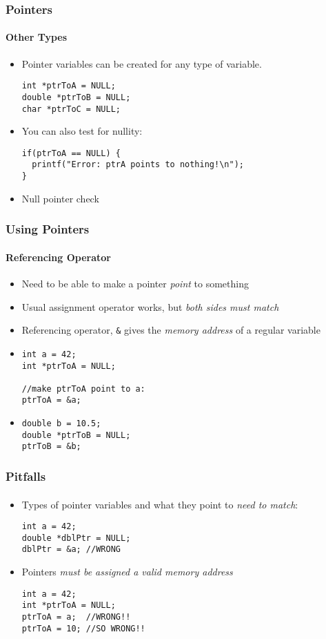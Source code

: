 \documentclass[]{beamer}
\begin{document}
\begin{frame}[fragile]
  \frametitle{Pointers}
  \framesubtitle{Other Types}

\begin{itemize}[<+->]
  \item Pointer variables can be created for any type of variable.
\begin{verbatim}
int *ptrToA = NULL;
double *ptrToB = NULL;
char *ptrToC = NULL;
\end{verbatim}

  \item You can also test for nullity:
\begin{verbatim}
if(ptrToA == NULL) {
  printf("Error: ptrA points to nothing!\n");
}
\end{verbatim}
  \item Null pointer check
\end{itemize}

\end{frame}


\begin{frame}[fragile]
  \frametitle{Using Pointers}
  \framesubtitle{Referencing Operator}

\begin{itemize}[<+->]
  \item Need to be able to make a pointer \emph{point} to something
  \item Usual assignment operator works, but \emph{both sides must match}
  \item Referencing operator, \texttt{&} gives the \emph{memory address} of a regular variable
  \item[~]
\begin{verbatim}
int a = 42;
int *ptrToA = NULL;

//make ptrToA point to a:
ptrToA = &a;
\end{verbatim}
  \item[~]
\begin{verbatim}
double b = 10.5;
double *ptrToB = NULL;
ptrToB = &b;
\end{verbatim}
\end{itemize}
    
\end{frame}

\begin{frame}[fragile]
  \frametitle{Pitfalls}
  \framesubtitle{}

\begin{itemize}[<+->]
  \item Types of pointer variables and what they point to \emph{need to match}:
\begin{verbatim}
int a = 42;
double *dblPtr = NULL;
dblPtr = &a; //WRONG
\end{verbatim}
  \item Pointers \emph{must be assigned a valid memory address}
\begin{verbatim}
int a = 42;
int *ptrToA = NULL;
ptrToA = a;  //WRONG!!
ptrToA = 10; //SO WRONG!!
\end{verbatim}

\end{itemize}

\end{frame}
\end{document}
